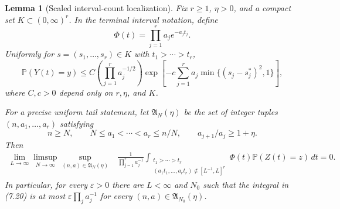 \documentclass[11pt]{article}
\newtheorem{lemma}[theorem]{Lemma}
\theoremstyle{remark}
\newcommand{\Pp}{\mathbb P}
\newcommand{\dd}{\,d}
\begin{document}
\begin{lemma}[Scaled interval-count localization]
\label{lem:terminal-interval-tilt}
Fix $r\ge1$, $\eta>0$, and a compact set $K\subset(0,\infty)^r$.  In the
terminal interval notation, define
\[
        \Phi(t)=\prod_{j=1}^r a_j e^{-a_jt_j}.
\]
Uniformly for $s=(s_1,\ldots,s_r)\in K$ with $t_1>\cdots>t_r$,
\[
        \Pp(Y(t)=y)
        \le C\left(\prod_{j=1}^r a_j^{-1/2}\right)
        \exp\left[-c\sum_{j=1}^r
        a_j\min\{(s_j-s_j^*)^2,1\}\right],
        \tag{7.19}
\]
where $C,c>0$ depend only on $r,\eta$, and $K$.

For a precise uniform tail statement, let $\mathfrak A_N(\eta)$ be the set of
integer tuples $(n,a_1,\ldots,a_r)$ satisfying
\[
        n\ge N,\qquad
        N\le a_1<\cdots<a_r\le n/N,
        \qquad a_{j+1}/a_j\ge1+\eta.
\]
Then
\[
\begin{aligned}\lim_{L\to\infty}\limsup_{N\to\infty}
\sup_{(n,a)\in\mathfrak A_N(\eta)}
&\frac{1}{\prod_{j=1}^r a_j^{-1}}
\int_{\substack{t_1>\cdots>t_r\\
        (a_1t_1,\ldots,a_rt_r)\notin[L^{-1},L]^r}}
        \Phi(t)\Pp(Z(t)=z)\dd t
=0.
\end{aligned}\tag{7.20}
\]
In particular, for every $\varepsilon>0$ there are $L<\infty$ and $N_0$ such
that the integral in (7.20) is at most
$\varepsilon\prod_j a_j^{-1}$ for every
$(n,a)\in\mathfrak A_{N_0}(\eta)$.
\end{lemma}
\end{document}
